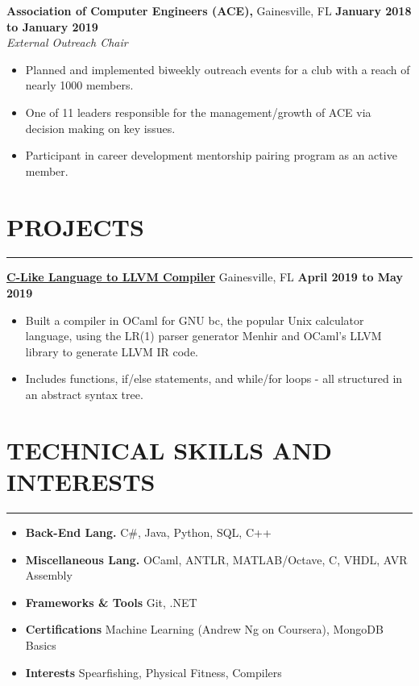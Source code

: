 \documentclass[11pt]{article} %
\begin{document}
		\noindent \textbf{Association of Computer Engineers (ACE),} Gainesville, FL \hfill\textbf{January 2018 to January 2019}\\
		\textit{External Outreach Chair}
		\begin{itemize}[noitemsep,nolistsep, label={-}]
			\item Planned and implemented biweekly outreach events for a club with a reach of nearly 1000 members.
			\item One of 11 leaders responsible for the management/growth of ACE via decision making on key issues.
			\item Participant in career development mentorship pairing program as an active member.
		\end{itemize}
		\vspace{.20cm}
	
	\section*{PROJECTS}
		\hrule \relax
		\vspace{.4cm}
		
		\noindent \href{https://github.com/hodsonus/programming-language-concepts}{\textbf{C-Like Language to LLVM Compiler}} Gainesville, FL  \hfill\textbf{April 2019 to May 2019}
		\begin{itemize}[noitemsep,nolistsep, label={-}]
			\item Built a compiler in OCaml for GNU bc, the popular Unix calculator language, using the LR(1) parser generator Menhir and OCaml's LLVM library to generate LLVM IR code.
			\item Includes functions, if/else statements, and while/for loops - all structured in an abstract syntax tree.
		\end{itemize}
		
		\vspace{.20cm}
	
	\section*{TECHNICAL SKILLS AND INTERESTS}
		\hrule \relax
		\vspace{.4cm}
		
		\begin{itemize}[noitemsep,nolistsep, label={}]
			\item \textbf{Back-End Lang.}                    \tabto*{5cm} C\#, Java, Python, SQL, C++
			\item \textbf{Miscellaneous Lang.}             \tabto*{5cm} OCaml, ANTLR, MATLAB/Octave, C, VHDL, AVR Assembly
			\item \textbf{Frameworks \& Tools}  \tabto*{5cm} Git, .NET
			\item \textbf{Certifications}			   \tabto*{5cm} Machine Learning (Andrew Ng on Coursera), MongoDB Basics
			\item \textbf{Interests}                     \tabto*{5cm} Spearfishing, Physical Fitness, Compilers
		\end{itemize}
		
\end{document}
